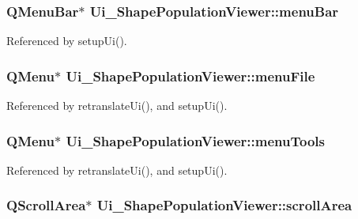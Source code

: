 \hypertarget{class_ui___shape_population_viewer_a62491d50e5e5da4a1253417b27fa9af8}{
\subsubsection[{menu\-Bar}]{\setlength{\rightskip}{0pt plus 5cm}Q\-Menu\-Bar$\ast$ Ui\-\_\-\-Shape\-Population\-Viewer\-::menu\-Bar}}\label{class_ui___shape_population_viewer_a62491d50e5e5da4a1253417b27fa9af8}


Referenced by setup\-Ui().

\hypertarget{class_ui___shape_population_viewer_a3e1f6eece1982ca2e0ecfea1fe60389e}{
\subsubsection[{menu\-File}]{\setlength{\rightskip}{0pt plus 5cm}Q\-Menu$\ast$ Ui\-\_\-\-Shape\-Population\-Viewer\-::menu\-File}}\label{class_ui___shape_population_viewer_a3e1f6eece1982ca2e0ecfea1fe60389e}


Referenced by retranslate\-Ui(), and setup\-Ui().

\hypertarget{class_ui___shape_population_viewer_a643fe8b0da014e88840718671ee9d360}{
\subsubsection[{menu\-Tools}]{\setlength{\rightskip}{0pt plus 5cm}Q\-Menu$\ast$ Ui\-\_\-\-Shape\-Population\-Viewer\-::menu\-Tools}}\label{class_ui___shape_population_viewer_a643fe8b0da014e88840718671ee9d360}


Referenced by retranslate\-Ui(), and setup\-Ui().

\hypertarget{class_ui___shape_population_viewer_a4321ba9527394aa5dd0ea86904e5c079}{
\subsubsection[{scroll\-Area}]{\setlength{\rightskip}{0pt plus 5cm}Q\-Scroll\-Area$\ast$ Ui\-\_\-\-Shape\-Population\-Viewer\-::scroll\-Area}}\label{class_ui___shape_population_viewer_a4321ba9527394aa5dd0ea86904e5c079}


